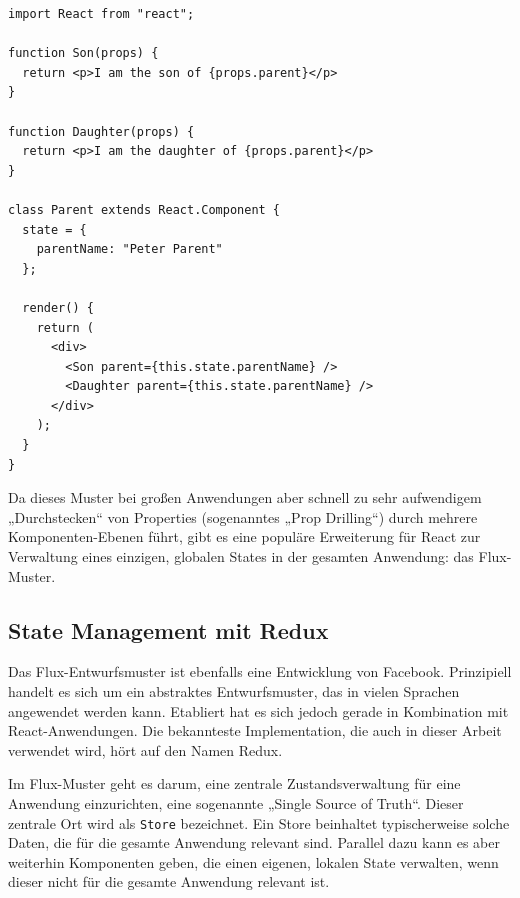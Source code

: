 \begin{minipage}{\linewidth}
\begin{lstlisting}[caption={„Lifting state up“: Mehrere Komponenten greifen auf die gleichen Daten zu.}]
import React from "react";

function Son(props) {
  return <p>I am the son of {props.parent}</p>
}

function Daughter(props) {
  return <p>I am the daughter of {props.parent}</p>
}

class Parent extends React.Component {
  state = {
    parentName: "Peter Parent"
  };

  render() {
    return (
      <div>
        <Son parent={this.state.parentName} />
        <Daughter parent={this.state.parentName} />
      </div>
    );
  }
}
\end{lstlisting}
\end{minipage}

Da dieses Muster bei großen Anwendungen aber schnell zu sehr aufwendigem „Durchstecken“ von Properties (sogenanntes „Prop Drilling“) durch mehrere Komponenten-Ebenen führt, gibt es eine populäre Erweiterung für React zur Verwaltung eines einzigen, globalen States in der gesamten Anwendung: das Flux-Muster\cite{web:flux_doku}.


\subsection{State Management mit Redux}
\label{chap:redux_state_management}
Das Flux-Entwurfsmuster ist ebenfalls eine Entwicklung von Facebook. Prinzipiell handelt es sich um ein abstraktes Entwurfsmuster, das in vielen Sprachen angewendet werden kann. Etabliert hat es sich jedoch gerade in Kombination mit React-Anwendungen. Die bekannteste Implementation, die auch in dieser Arbeit verwendet wird, hört auf den Namen Redux\cite{web:redux}.

Im Flux-Muster geht es darum, eine zentrale Zustandsverwaltung für eine Anwendung einzurichten, eine sogenannte „Single Source of Truth“. Dieser zentrale Ort wird als \texttt{Store} bezeichnet. Ein Store beinhaltet typischerweise solche Daten, die für die gesamte Anwendung relevant sind. Parallel dazu kann es aber weiterhin Komponenten geben, die einen eigenen, lokalen State verwalten, wenn dieser nicht für die gesamte Anwendung relevant ist.


